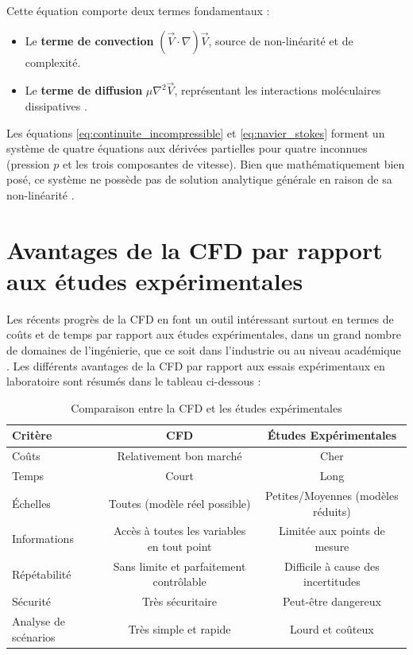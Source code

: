 Cette équation comporte deux termes fondamentaux :
\begin{itemize}
    \item Le \textbf{terme de convection} \( (\vec{V} \cdot \nabla)\vec{V} \), source de non-linéarité et de complexité. \item Le \textbf{terme de diffusion} \( \mu \nabla^2 \vec{V} \), représentant les interactions moléculaires dissipatives \cite{white2015fluid}. \end{itemize}

Les équations \eqref{eq:continuite_incompressible} et \eqref{eq:navier_stokes} forment un système de quatre équations aux dérivées partielles pour quatre inconnues (pression $p$ et les trois composantes de vitesse). Bien que mathématiquement bien posé, ce système ne possède pas de solution analytique générale en raison de sa non-linéarité \cite{kundu2015fluid}.

\section{Avantages de la CFD par rapport aux études expérimentales}
\label{sec:avantages_cfd}

Les récents progrès de la CFD en font un outil intéressant surtout en termes de coûts et de temps par rapport aux études expérimentales, dans un grand nombre de domaines de l'ingénierie, que ce soit dans l'industrie ou au niveau académique \cite{wendt2009computational}. Les différents avantages de la CFD par rapport aux essais expérimentaux en laboratoire sont résumés dans le tableau ci-dessous : \cite{roychowdhury2020computational}

\begin{table}[H]
    \centering
    \caption{Comparaison entre la CFD et les études expérimentales}
    \label{tab:comparaison_cfd_exp}
    \begin{tabular}{|l|c|c|}
        \hline
        \textbf{Critère} & \textbf{CFD} & \textbf{Études Expérimentales} \\
        \hline
        Coûts & Relativement bon marché & Cher \\
        \hline
        Temps & Court & Long \\
        \hline
        Échelles & Toutes (modèle réel possible) & Petites/Moyennes (modèles réduits) \\
        \hline
        Informations & Accès à toutes les variables en tout point & Limitée aux points de mesure \\
        \hline
        Répétabilité & Sans limite et parfaitement contrôlable & Difficile à cause des incertitudes \\
        \hline
        Sécurité & Très sécuritaire & Peut-être dangereux \\
        \hline
        Analyse de scénarios & Très simple et rapide & Lourd et coûteux \\
        \hline
    \end{tabular}
\end{table}

